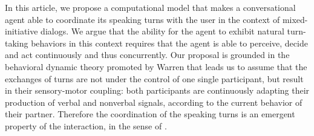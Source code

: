 
In this article, we propose a computational model that makes a conversational agent able to coordinate its speaking turns with the user in the context of mixed-initiative dialogs. 
We argue that the ability for the agent to exhibit natural turn-taking behaviors in this context requires that the agent is able to perceive, decide and act continuously and thus concurrently. 
Our proposal is grounded in the behavioral dynamic theory promoted by Warren \cite{warren_dynamics_2006} that leads us to assume that the exchanges of turns are not under the control of one single participant, but result in their sensory-motor coupling: both participants are continuously adapting their production of verbal and nonverbal signals, according to the current behavior of their partner. Therefore the coordination of the speaking turns is an emergent property of the interaction, in the sense of \cite{warren_dynamics_2006}. 




